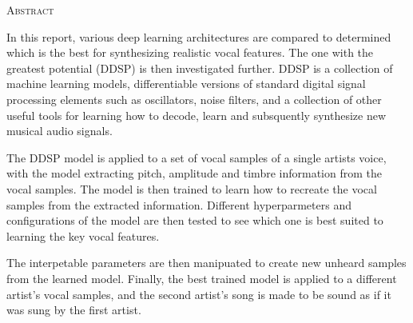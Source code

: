 \begin{center}
  \textsc{Abstract}
\end{center}
%
\noindent
%
In this report, various deep learning architectures are compared to determined which is the best for synthesizing realistic vocal features. The one with the greatest potential (DDSP) is then investigated further. DDSP is a collection of machine learning models, differentiable versions of standard digital signal processing elements such as oscillators, noise filters, and a collection of other useful tools for learning how to decode, learn and subsquently synthesize new musical audio signals.

The DDSP model is applied to a set of vocal samples of a single artists voice, with the model extracting pitch, amplitude and timbre information from the vocal samples. The model is then trained to learn how to recreate the vocal samples from the extracted information. Different hyperparmeters and configurations of the model are then tested to see which one is best suited to learning the key vocal features.

The interpetable parameters are then manipuated to create new unheard samples from the learned model. Finally, the best trained model is applied to a different artist's vocal samples, and the second artist's song is made to be sound as if it was sung by the first artist.